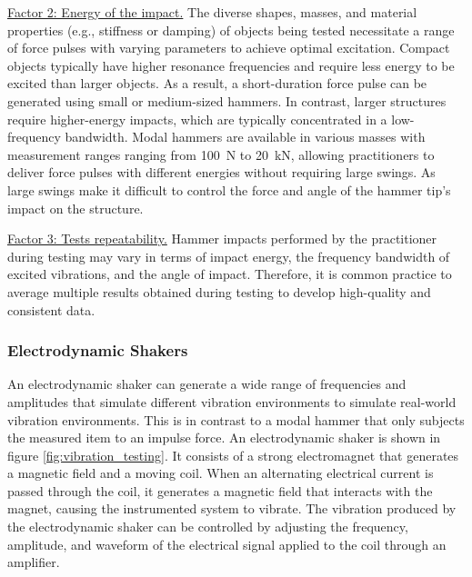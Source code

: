\documentclass[12pt,letter]{article}
\begin{document}
\pagebreak

\underline{Factor 2: Energy of the impact.} The diverse shapes, masses, and material properties (e.g., stiffness or damping) of objects being tested necessitate a range of force pulses with varying parameters to achieve optimal excitation. Compact objects typically have higher resonance frequencies and require less energy to be excited than larger objects. As a result, a short-duration force pulse can be generated using small or medium-sized hammers. In contrast, larger structures require higher-energy impacts, which are typically concentrated in a low-frequency bandwidth. Modal hammers are available in various masses with measurement ranges ranging from 100~N to 20~kN, allowing practitioners to deliver force pulses with different energies without requiring large swings. As large swings make it difficult to control the force and angle of the hammer tip's impact on the structure.

\underline{Factor 3: Tests repeatability.} Hammer impacts performed by the practitioner during testing may vary in terms of impact energy, the frequency bandwidth of excited vibrations, and the angle of impact. Therefore, it is common practice to average multiple results obtained during testing to develop high-quality and consistent data.











\subsubsection{Electrodynamic Shakers}

An electrodynamic shaker can generate a wide range of frequencies and amplitudes that simulate different vibration environments to simulate real-world vibration environments. This is in contrast to a modal hammer that only subjects the measured item to an impulse force. An electrodynamic shaker is shown in figure \ref{fig:vibration_testing}. It consists of a strong electromagnet that generates a magnetic field and a moving coil. When an alternating electrical current is passed through the coil, it generates a magnetic field that interacts with the magnet, causing the instrumented system to vibrate. The vibration produced by the electrodynamic shaker can be controlled by adjusting the frequency, amplitude, and waveform of the electrical signal applied to the coil through an amplifier.
\end{document}
